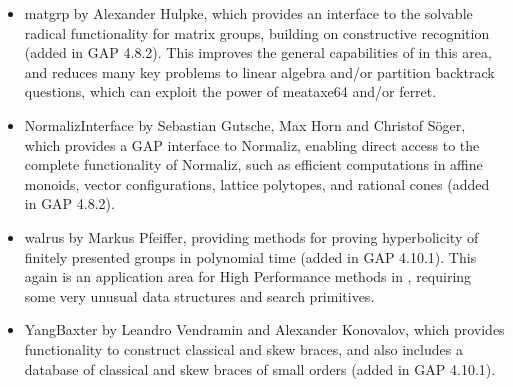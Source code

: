 \begin{itemize}
\item
{\sf matgrp}  by Alexander Hulpke, which provides an interface
to the solvable radical functionality for matrix groups, building on
constructive recognition (added in GAP 4.8.2). This improves the
general capabilities of \GAP in this area, and reduces many key
problems to linear algebra and/or partition backtrack questions, which
can exploit the power of meataxe64 and/or ferret.

\item
{\sf NormalizInterface}  by Sebastian Gutsche, Max Horn and
Christof S\"oger, which provides a GAP interface to Normaliz, enabling
direct access to the complete functionality of Normaliz, such as efficient
computations in affine monoids, vector configurations, lattice
polytopes, and rational cones (added in GAP 4.8.2). 

\item
{\sf walrus} by Markus Pfeiffer, providing methods for proving 
hyperbolicity of finitely presented groups in polynomial time
(added in GAP 4.10.1). This again is an application area for High
Performance methods in \GAP, requiring some very unusual data
structures and search primitives.

\item
{\sf YangBaxter} by Leandro Vendramin and Alexander Konovalov, 
which provides functionality to construct classical and 
skew braces, and also includes a database of classical 
and skew braces of small orders (added in GAP 4.10.1).

\end{itemize}
